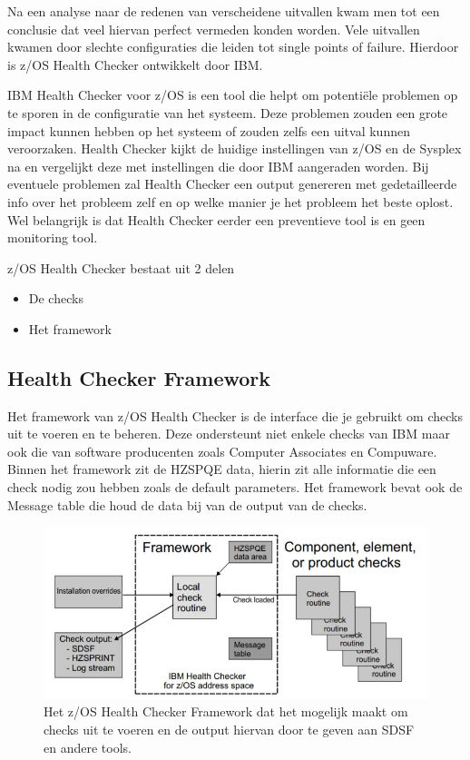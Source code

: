 Na een analyse naar de redenen van verscheidene uitvallen kwam men tot een conclusie dat veel hiervan perfect vermeden konden worden. Vele uitvallen kwamen door slechte configuraties die leiden tot single points of failure. Hierdoor is z/OS Health Checker ontwikkelt door IBM. \cite{Walle2013}

IBM Health Checker voor z/OS is een tool die helpt om potentiële problemen op te sporen in de configuratie van het systeem. Deze problemen zouden een grote impact kunnen hebben op het systeem of zouden zelfs een uitval kunnen veroorzaken. Health Checker kijkt de huidige instellingen van z/OS en de Sysplex na en vergelijkt deze met instellingen die door IBM aangeraden worden. Bij eventuele problemen zal Health Checker een output genereren met gedetailleerde info over het probleem zelf en op welke manier je het probleem het beste oplost. Wel belangrijk is dat Health Checker eerder een preventieve tool is en geen monitoring tool. \cite{Bezzi2010}

z/OS Health Checker bestaat uit 2 delen
\begin{itemize}
	\item De checks
	\item Het framework	
\end{itemize}

\subsection{Health Checker Framework}
\label{subsec:Health Checker Framework}

Het framework van z/OS Health Checker is de interface die je gebruikt om checks uit te voeren en te beheren. Deze ondersteunt niet enkele checks van IBM maar ook die van software producenten zoals Computer Associates en Compuware. Binnen het framework zit de HZSPQE data, hierin zit alle informatie die een check nodig zou hebben zoals de default parameters. Het framework bevat ook de Message table die houd de data bij van de output van de checks. \cite{IBMCorporation2019}

\begin{figure}[h]
	\centering
	\includegraphics[width=0.7\linewidth]{img/HCFramework}
	\caption[z/OS Health Checker Framework]{Het z/OS Health Checker Framework dat het mogelijk maakt om checks uit te voeren en de output hiervan door te geven aan SDSF en andere tools.}
	\label{fig:hcframework}
\end{figure}


